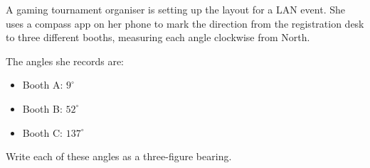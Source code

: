\begin{question}
\noindent A gaming tournament organiser is setting up the layout for a LAN event. She uses a compass app on her phone to mark the direction from the registration desk to three different booths, measuring each angle clockwise from North.

The angles she records are:
\begin{itemize}
    \item Booth A: $9^\circ$
    \item Booth B: $52^\circ$
    \item Booth C: $137^\circ$
\end{itemize}

\noindent Write each of these angles as a three-figure bearing.

\vspace{4cm}

\begin{flushright}
\end{flushright}
\end{question}

